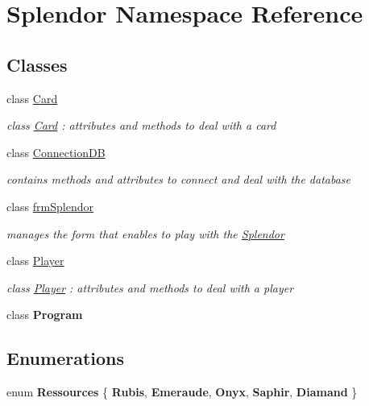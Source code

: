 \hypertarget{namespace_splendor}{}\section{Splendor Namespace Reference}
\label{namespace_splendor}
\subsection*{Classes}
\begin{DoxyCompactItemize}
\item 
class \mbox{\hyperlink{class_splendor_1_1_card}{Card}}
\begin{DoxyCompactList}\small\item\em class \mbox{\hyperlink{class_splendor_1_1_card}{Card}} \+: attributes and methods to deal with a card \end{DoxyCompactList}\item 
class \mbox{\hyperlink{class_splendor_1_1_connection_d_b}{Connection\+DB}}
\begin{DoxyCompactList}\small\item\em contains methods and attributes to connect and deal with the database \end{DoxyCompactList}\item 
class \mbox{\hyperlink{class_splendor_1_1frm_splendor}{frm\+Splendor}}
\begin{DoxyCompactList}\small\item\em manages the form that enables to play with the \mbox{\hyperlink{namespace_splendor}{Splendor}} \end{DoxyCompactList}\item 
class \mbox{\hyperlink{class_splendor_1_1_player}{Player}}
\begin{DoxyCompactList}\small\item\em class \mbox{\hyperlink{class_splendor_1_1_player}{Player}} \+: attributes and methods to deal with a player \end{DoxyCompactList}\item 
class {\bfseries Program}
\end{DoxyCompactItemize}
\subsection*{Enumerations}
\begin{DoxyCompactItemize}
\item 
\mbox{\label{namespace_splendor_abc955fe800ad5f701f777df0a2a29dc2}} 
enum {\bfseries Ressources} \{ \newline
{\bfseries Rubis}, 
{\bfseries Emeraude}, 
{\bfseries Onyx}, 
{\bfseries Saphir}, 
\newline
{\bfseries Diamand}
 \}
\end{DoxyCompactItemize}
